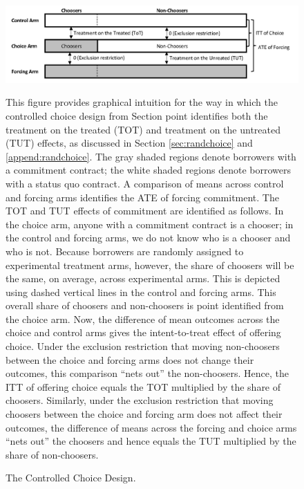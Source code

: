 \documentclass[11pt, a4paper]{article}
\begin{document}
\begin{figure}
    \begin{center}
        \centering
        \includegraphics[width=1.0\textwidth]{Figuras/tot_tut_intuition.png}
    \end{center}
 \caption{The Controlled Choice Design.}
 \scriptsize{This figure provides graphical intuition for the way in which the controlled choice design from Section point identifies both the treatment on the treated (TOT) and treatment on the untreated (TUT) effects, as discussed in Section \ref{sec:randchoice} and \ref{append:randchoice}. 
    The gray shaded regions denote borrowers with a commitment contract; the white shaded regions denote borrowers with a status quo contract.
    A comparison of means across control and forcing arms identifies the ATE of forcing  commitment.
    The TOT and TUT effects of commitment are identified as follows.
    In the choice arm, anyone with a commitment contract is a chooser; in the control and forcing arms, we do not know who is a chooser and who is not.
    Because borrowers are randomly assigned to experimental treatment arms, however, the share of choosers will be the same, on average, across experimental arms.
    This is depicted using dashed vertical lines in the control and forcing arms.
    This overall share of choosers and non-choosers is point identified from the choice arm.
    Now, the difference of mean outcomes across the choice and control arms gives the intent-to-treat effect of offering choice.
    Under the exclusion restriction that moving non-choosers between the choice and forcing arms does not change their outcomes, this comparison ``nets out'' the non-choosers.
    Hence, the ITT of offering choice equals the TOT multiplied by the share of choosers. 
    Similarly, under the exclusion restriction that moving choosers between the choice and forcing arm does not affect their outcomes, the difference of means across the forcing and choice arms ``nets out'' the choosers and hence equals the TUT multiplied by the share of non-choosers.}
    \label{tot_tut_graph}
\end{figure}   
\end{document}

